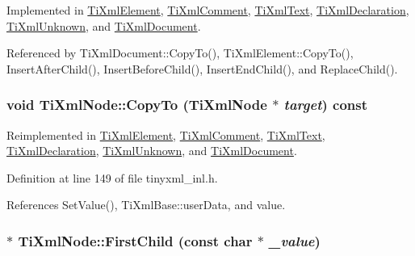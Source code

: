 Implemented in \hyperlink{class_ti_xml_element_a13f6df105ebb1e8dc636e75cc883be32}{TiXmlElement}, \hyperlink{class_ti_xml_comment_a4f6590c9c9a2b63a48972655b78eb853}{TiXmlComment}, \hyperlink{class_ti_xml_text_adde1869dfb029be50713fbfd8ce4d21f}{TiXmlText}, \hyperlink{class_ti_xml_declaration_aff8231266d735943d8a7514a9c9822b9}{TiXmlDeclaration}, \hyperlink{class_ti_xml_unknown_a675c4b2684af35e4c7649b7fd5ae598d}{TiXmlUnknown}, and \hyperlink{class_ti_xml_document_ac9e8f09b23454d953b32d1b65cd1409e}{TiXmlDocument}.

Referenced by TiXmlDocument::CopyTo(), TiXmlElement::CopyTo(), InsertAfterChild(), InsertBeforeChild(), InsertEndChild(), and ReplaceChild().\hypertarget{class_ti_xml_node_ab6056978923ad8350fb5164af32d8038}{
\subsubsection[{CopyTo}]{\setlength{\rightskip}{0pt plus 5cm}void TiXmlNode::CopyTo ({\bf TiXmlNode} $\ast$ {\em target}) const}}
\label{class_ti_xml_node_ab6056978923ad8350fb5164af32d8038}


Reimplemented in \hyperlink{class_ti_xml_element_a9e0c1983b840de4134f1f6bf7af00b0f}{TiXmlElement}, \hyperlink{class_ti_xml_comment_a3175b2f27628f4fb7a043897930cd934}{TiXmlComment}, \hyperlink{class_ti_xml_text_adcec7d9b6fccfc5777452bb97e6031c1}{TiXmlText}, \hyperlink{class_ti_xml_declaration_a9d08959f935421a593032bd3efb30c38}{TiXmlDeclaration}, \hyperlink{class_ti_xml_unknown_a08ca7b225a2bcb604d3c72e199d33408}{TiXmlUnknown}, and \hyperlink{class_ti_xml_document_af69deeb984e060bd00f668460dec8ef2}{TiXmlDocument}.

Definition at line 149 of file tinyxml\_\-inl.h.

References SetValue(), TiXmlBase::userData, and value.\hypertarget{class_ti_xml_node_abc8bf32be6419ec453a731868de19554}{
\subsubsection[{FirstChild}]{$\ast$ TiXmlNode::FirstChild (const char $\ast$ {\em \_\-value})}}
\label{class_ti_xml_node_abc8bf32be6419ec453a731868de19554}


